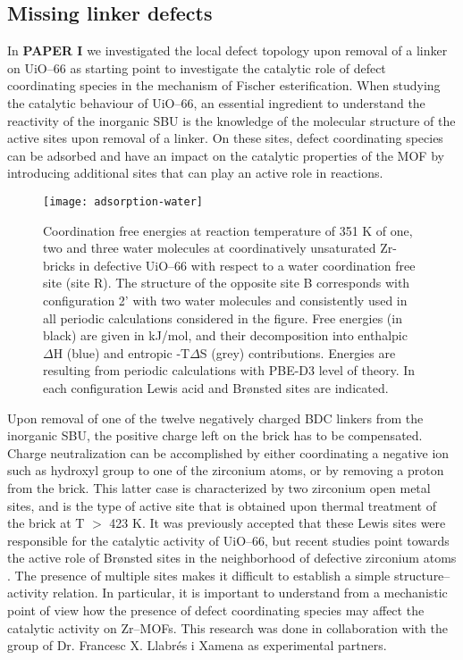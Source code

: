 \subsection*{Missing linker defects}
In \textbf{PAPER I} we investigated the local defect topology upon removal of a linker on UiO--66 as starting point to investigate the catalytic role of defect coordinating species in the mechanism of Fischer esterification. When studying the catalytic behaviour of UiO--66, an essential ingredient to understand the reactivity of the inorganic SBU is the knowledge of the molecular structure of the active sites upon removal of a linker. On these sites, defect coordinating species can be adsorbed and have an impact on the catalytic properties of the MOF by introducing additional sites that can play an active role in reactions. 
\begin{figure}[!htbp]
	\centering
	\texttt{[image: adsorption-water]}
	\caption{Coordination free energies at reaction temperature of 351 K of one, two and three water molecules at coordinatively unsaturated Zr-bricks in defective UiO--66 with respect to a water coordination free site (site R). The structure of the opposite site B corresponds with configuration 2’ with two water molecules and consistently used in all periodic calculations considered in the figure. Free energies (in black) are given in kJ/mol, and their decomposition into enthalpic $\Delta$H (blue) and entropic -T$\Delta$S (grey) contributions. Energies are resulting from periodic calculations with PBE-D3 level of theory. In each configuration Lewis acid and Brønsted sites are indicated.}
	\label{fig:adsorption-water}
\end{figure}
Upon removal of one of the twelve negatively charged BDC linkers from the inorganic  SBU, the positive charge left on the brick has to be compensated. Charge neutralization can be accomplished by either coordinating a negative ion such as hydroxyl group to one of the zirconium atoms, or by removing a proton from the brick. This latter case is characterized by two zirconium open metal sites, and is the type of active site that is obtained upon thermal treatment of the brick at T $>$ 423 K. It was previously accepted that these Lewis sites were responsible for the catalytic activity of UiO--66, but recent studies point towards the active role of Br\o{}nsted sites in the neighborhood of defective zirconium atoms \cite{canivet2014water, oien2014detailed, canivet2016origin, ling2016dynamic, liu2016probing, klet2016evaluation, vandichel2016water, ghosh2014water}. The presence of multiple sites makes it difficult to establish a simple structure--activity relation. In particular, it is important to understand from a mechanistic point of view how the presence of defect coordinating species may affect the catalytic activity on Zr--MOFs. This research was done in collaboration with the group of Dr. Francesc X. Llabr\'es i Xamena as experimental partners. 
